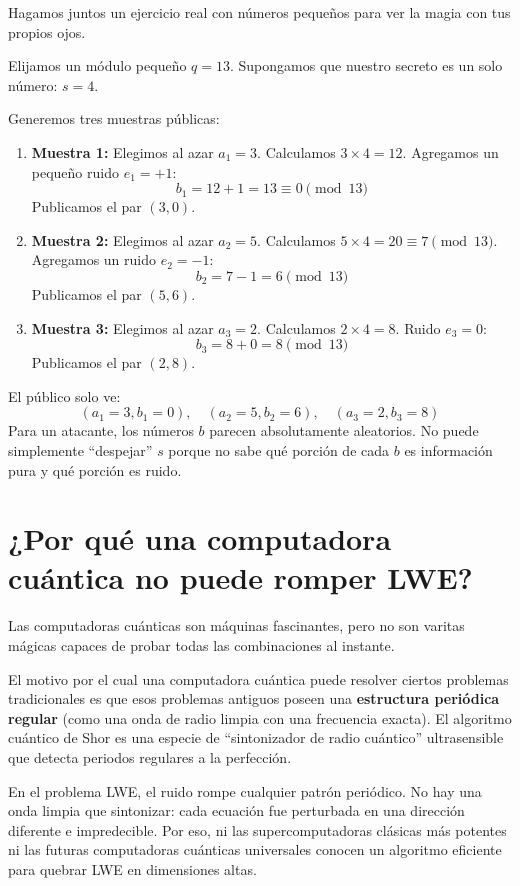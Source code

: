 Hagamos juntos un ejercicio real con números pequeños para ver la magia con tus propios ojos.

\begin{ejemplonumerico}[LWE con módulo $q=13$]
Elijamos un módulo pequeño $q = 13$.
Supongamos que nuestro secreto es un solo número: $s = 4$.

Generemos tres muestras públicas:
\begin{enumerate}
  \item \textbf{Muestra 1:} Elegimos al azar $a_1 = 3$. 
  Calculamos $3 \times 4 = 12$. Agregamos un pequeño ruido $e_1 = +1$:
  \[
  b_1 = 12 + 1 = 13 \equiv 0 \pmod{13}
  \]
  Publicamos el par $(3, 0)$.
  
  \item \textbf{Muestra 2:} Elegimos al azar $a_2 = 5$. 
  Calculamos $5 \times 4 = 20 \equiv 7 \pmod{13}$. Agregamos un ruido $e_2 = -1$:
  \[
  b_2 = 7 - 1 = 6 \pmod{13}
  \]
  Publicamos el par $(5, 6)$.
  
  \item \textbf{Muestra 3:} Elegimos al azar $a_3 = 2$. 
  Calculamos $2 \times 4 = 8$. Ruido $e_3 = 0$:
  \[
  b_3 = 8 + 0 = 8 \pmod{13}
  \]
  Publicamos el par $(2, 8)$.
\end{enumerate}

El público solo ve:
\[
(a_1=3, b_1=0), \quad (a_2=5, b_2=6), \quad (a_3=2, b_3=8)
\]
Para un atacante, los números $b$ parecen absolutamente aleatorios. No puede simplemente ``despejar'' $s$ porque no sabe qué porción de cada $b$ es información pura y qué porción es ruido.
\end{ejemplonumerico}

\section{¿Por qué una computadora cuántica no puede romper LWE?}

Las computadoras cuánticas son máquinas fascinantes, pero no son varitas mágicas capaces de probar todas las combinaciones al instante. 

El motivo por el cual una computadora cuántica puede resolver ciertos problemas tradicionales es que esos problemas antiguos poseen una \textbf{estructura periódica regular} (como una onda de radio limpia con una frecuencia exacta). El algoritmo cuántico de Shor es una especie de ``sintonizador de radio cuántico'' ultrasensible que detecta periodos regulares a la perfección.

\begin{intuicion}
En el problema LWE, el ruido rompe cualquier patrón periódico. No hay una onda limpia que sintonizar: cada ecuación fue perturbada en una dirección diferente e impredecible. Por eso, ni las supercomputadoras clásicas más potentes ni las futuras computadoras cuánticas universales conocen un algoritmo eficiente para quebrar LWE en dimensiones altas.
\end{intuicion}


